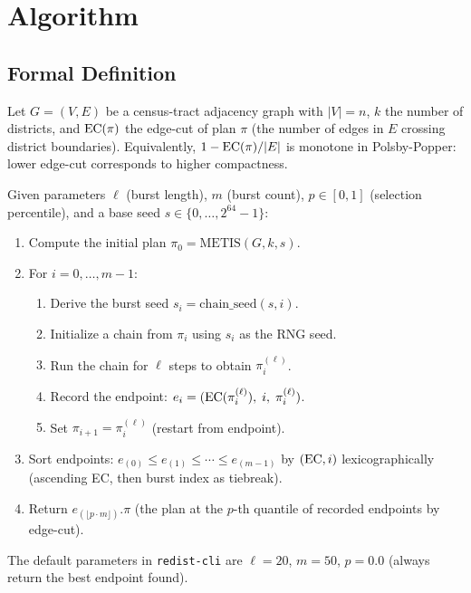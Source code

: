 \section{Algorithm}
\label{sec:algorithm}

\subsection{Formal Definition}

Let $G = (V, E)$ be a census-tract adjacency graph with $|V| = n$,
$k$ the number of districts, and $\mathrm{EC}(\pi)$ the edge-cut of plan $\pi$
(the number of edges in $E$ crossing district boundaries).
Equivalently, $1 - \mathrm{EC}(\pi)/|E|$ is monotone in Polsby-Popper: lower
edge-cut corresponds to higher compactness.

\begin{definition}[\shb{}]
\label{def:short-burst}
Given parameters $\ell$ (burst length), $m$ (burst count), $p \in [0, 1]$
(selection percentile), and a base seed $s \in \{0, \ldots, 2^{64}-1\}$:
\begin{enumerate}
\item Compute the initial plan $\pi_0 = \mathrm{METIS}(G, k, s)$.
\item For $i = 0, \ldots, m-1$:
  \begin{enumerate}
  \item Derive the burst seed $s_i = \mathrm{chain\_seed}(s, i)$.
  \item Initialize a \recom{} chain from $\pi_i$ using $s_i$ as the RNG seed.
  \item Run the chain for $\ell$ steps to obtain $\pi_i^{(\ell)}$.
  \item Record the endpoint: $e_i = (\mathrm{EC}(\pi_i^{(\ell)}),\; i,\; \pi_i^{(\ell)})$.
  \item Set $\pi_{i+1} = \pi_i^{(\ell)}$ (restart from endpoint).
  \end{enumerate}
\item Sort endpoints: $e_{(0)} \leq e_{(1)} \leq \cdots \leq e_{(m-1)}$
      by $(\mathrm{EC}, i)$ lexicographically (ascending EC, then burst index as tiebreak).
\item Return $e_{(\lfloor p \cdot m \rfloor)}.\pi$ (the plan at the $p$-th
      quantile of recorded endpoints by edge-cut).
\end{enumerate}
\end{definition}

The default parameters in \texttt{redist-cli} are $\ell = 20$, $m = 50$,
$p = 0.0$ (always return the best endpoint found).

